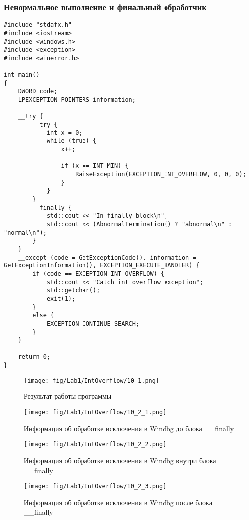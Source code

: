 \subsubsection{Ненормальное выполнение и финальный обработчик}
\begin{lstlisting}[caption=Обработка исключений с использованием блока \_\_finally]
#include "stdafx.h"
#include <iostream>
#include <windows.h>
#include <exception>
#include <winerror.h>

int main()
{
    DWORD code;
    LPEXCEPTION_POINTERS information;

    __try {
        __try {
            int x = 0;
            while (true) {
                x++;

                if (x == INT_MIN) {
                    RaiseException(EXCEPTION_INT_OVERFLOW, 0, 0, 0);
                }
            }
        }
        __finally {
            std::cout << "In finally block\n";
            std::cout << (AbnormalTermination() ? "abnormal\n" : "normal\n");
        }
    }
    __except (code = GetExceptionCode(), information = GetExceptionInformation(), EXCEPTION_EXECUTE_HANDLER) {
        if (code == EXCEPTION_INT_OVERFLOW) {
            std::cout << "Catch int overflow exception";
            std::getchar();
            exit(1);
        }
        else {
            EXCEPTION_CONTINUE_SEARCH;
        }
    }

    return 0;
}
\end{lstlisting}

\begin{figure}[H]
    \begin{center}
        \texttt{[image: fig/Lab1/IntOverflow/10\_1.png]}
        \caption{Результат работы программы}
        \label{pic:10_1}
    \end{center}
\end{figure}

\begin{figure}[H]
    \begin{center}
        \texttt{[image: fig/Lab1/IntOverflow/10\_2\_1.png]}
        \caption{Информация об обработке исключения в Windbg до блока \_\_finally}
        \label{pic:10_2_1}
    \end{center}
\end{figure}

\begin{figure}[H]
    \begin{center}
        \texttt{[image: fig/Lab1/IntOverflow/10\_2\_2.png]}
        \caption{Информация об обработке исключения в Windbg внутри блока \_\_finally}
        \label{pic:10_2_2}
    \end{center}
\end{figure}

\begin{figure}[H]
    \begin{center}
        \texttt{[image: fig/Lab1/IntOverflow/10\_2\_3.png]}
        \caption{Информация об обработке исключения в Windbg после блока \_\_finally}
        \label{pic:10_2_3}
    \end{center}
\end{figure}
